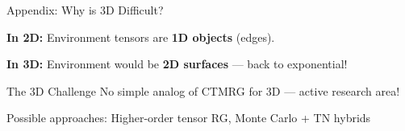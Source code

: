 \documentclass[aspectratio=169, 11pt]{beamer}
\newcommand{\highlight}[1]{\textcolor{accentred}{\textbf{#1}}}
\begin{document}
\begin{frame}{Appendix: Why is 3D Difficult?}
    
    \textbf{In 2D:} Environment tensors are \highlight{1D objects} (edges).
    
    \textbf{In 3D:} Environment would be \highlight{2D surfaces} --- back to exponential!
    
    \vspace{0.3cm}
    
    \begin{center}
    \end{center}
    
    \vspace{0.3cm}
    
    \begin{alertblock}{The 3D Challenge}
        No simple analog of CTMRG for 3D --- active research area!
        
        Possible approaches: Higher-order tensor RG, Monte Carlo + TN hybrids
    \end{alertblock}
\end{frame}
\end{document}
